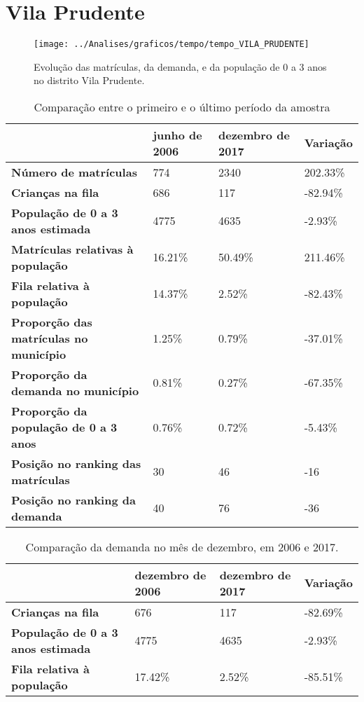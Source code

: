 \section{Vila Prudente}
\begin{figure}[H]
\centering
\texttt{[image: ../Analises/graficos/tempo/tempo\_VILA\_PRUDENTE]}
\caption{Evolução das matrículas, da demanda, e da população de 0 a 3 anos no distrito Vila Prudente.}
\end{figure}
\begin{table}[H]
\begin{tabular}{|l|l|l|l|}
\hline
\textbf{}                                      & \textbf{junho de 2006}       & \textbf{dezembro de 2017}    & \textbf{Variação} \\ \hline
\textbf{Número de matrículas}                  & 774 & 2340 & 202.33\% \\ \hline
\textbf{Crianças na fila}                      & 686 & 117 & -82.94\% \\ \hline
\textbf{População de 0 a 3 anos estimada}      & 4775 & 4635 & -2.93\% \\ \hline
\textbf{Matrículas relativas à população}      & 16.21\% & 50.49\% & 211.46\% \\ \hline
\textbf{Fila relativa à população}             & 14.37\% & 2.52\% & -82.43\% \\ \hline
\textbf{Proporção das matrículas no município} & 1.25\% & 0.79\% & -37.01\% \\ \hline
\textbf{Proporção da demanda no município}     & 0.81\% & 0.27\% & -67.35\% \\ \hline
\textbf{Proporção da população de 0 a 3 anos}  & 0.76\% & 0.72\% & -5.43\% \\ \hline
\textbf{Posição no ranking das matrículas}     & 30 & 46 & -16 \\ \hline
\textbf{Posição no ranking da demanda}         & 40 & 76 & -36 \\ \hline
\end{tabular}
\caption{Comparação entre o primeiro e o último período da amostra}
\end{table}
\begin{table}[H]
\begin{tabular}{|l|l|l|l|}
\hline
\textbf{}                                 & \textbf{dezembro de 2006} & \textbf{dezembro de 2017} & \textbf{Variação} \\ \hline
\textbf{Crianças na fila}                      & 676 & 117 & -82.69\% \\ \hline
\textbf{População de 0 a 3 anos estimada}      & 4775 & 4635 & -2.93\% \\ \hline
\textbf{Fila relativa à população}             & 17.42\% & 2.52\% & -85.51\% \\ \hline
\end{tabular}
\caption{Comparação da demanda no mês de dezembro, em 2006 e 2017.}
\end{table}
